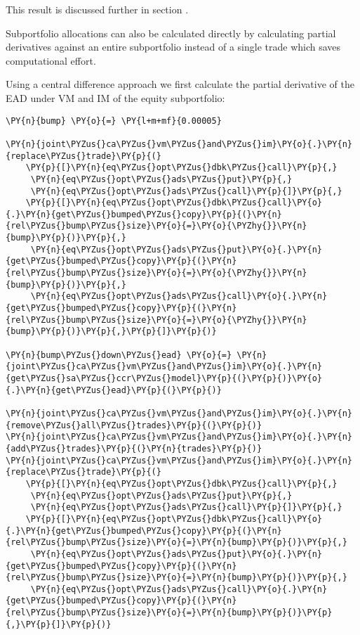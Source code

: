     This result is discussed further in section .

    Subportfolio allocations can also be calculated directly by calculating
partial derivatives against an entire subportfolio instead of a single
trade which saves computational effort.

Using a central difference approach we first calculate the partial
derivative of the EAD under VM and IM of the equity subportfolio:

    \begin{tcolorbox}[breakable, size=fbox, boxrule=1pt, pad at break*=1mm,colback=cellbackground, colframe=cellborder]
\begin{Verbatim}[commandchars=\\\{\}]
\PY{n}{bump} \PY{o}{=} \PY{l+m+mf}{0.00005}

\PY{n}{joint\PYZus{}ca\PYZus{}vm\PYZus{}and\PYZus{}im}\PY{o}{.}\PY{n}{replace\PYZus{}trade}\PY{p}{(}
    \PY{p}{[}\PY{n}{eq\PYZus{}opt\PYZus{}dbk\PYZus{}call}\PY{p}{,}
     \PY{n}{eq\PYZus{}opt\PYZus{}ads\PYZus{}put}\PY{p}{,}
     \PY{n}{eq\PYZus{}opt\PYZus{}ads\PYZus{}call}\PY{p}{]}\PY{p}{,}
    \PY{p}{[}\PY{n}{eq\PYZus{}opt\PYZus{}dbk\PYZus{}call}\PY{o}{.}\PY{n}{get\PYZus{}bumped\PYZus{}copy}\PY{p}{(}\PY{n}{rel\PYZus{}bump\PYZus{}size}\PY{o}{=}\PY{o}{\PYZhy{}}\PY{n}{bump}\PY{p}{)}\PY{p}{,}
     \PY{n}{eq\PYZus{}opt\PYZus{}ads\PYZus{}put}\PY{o}{.}\PY{n}{get\PYZus{}bumped\PYZus{}copy}\PY{p}{(}\PY{n}{rel\PYZus{}bump\PYZus{}size}\PY{o}{=}\PY{o}{\PYZhy{}}\PY{n}{bump}\PY{p}{)}\PY{p}{,}
     \PY{n}{eq\PYZus{}opt\PYZus{}ads\PYZus{}call}\PY{o}{.}\PY{n}{get\PYZus{}bumped\PYZus{}copy}\PY{p}{(}\PY{n}{rel\PYZus{}bump\PYZus{}size}\PY{o}{=}\PY{o}{\PYZhy{}}\PY{n}{bump}\PY{p}{)}\PY{p}{,}\PY{p}{]}\PY{p}{)}

\PY{n}{bump\PYZus{}down\PYZus{}ead} \PY{o}{=} \PY{n}{joint\PYZus{}ca\PYZus{}vm\PYZus{}and\PYZus{}im}\PY{o}{.}\PY{n}{get\PYZus{}sa\PYZus{}ccr\PYZus{}model}\PY{p}{(}\PY{p}{)}\PY{o}{.}\PY{n}{get\PYZus{}ead}\PY{p}{(}\PY{p}{)}

\PY{n}{joint\PYZus{}ca\PYZus{}vm\PYZus{}and\PYZus{}im}\PY{o}{.}\PY{n}{remove\PYZus{}all\PYZus{}trades}\PY{p}{(}\PY{p}{)}
\PY{n}{joint\PYZus{}ca\PYZus{}vm\PYZus{}and\PYZus{}im}\PY{o}{.}\PY{n}{add\PYZus{}trades}\PY{p}{(}\PY{n}{trades}\PY{p}{)}
\PY{n}{joint\PYZus{}ca\PYZus{}vm\PYZus{}and\PYZus{}im}\PY{o}{.}\PY{n}{replace\PYZus{}trade}\PY{p}{(}
    \PY{p}{[}\PY{n}{eq\PYZus{}opt\PYZus{}dbk\PYZus{}call}\PY{p}{,}
     \PY{n}{eq\PYZus{}opt\PYZus{}ads\PYZus{}put}\PY{p}{,}
     \PY{n}{eq\PYZus{}opt\PYZus{}ads\PYZus{}call}\PY{p}{]}\PY{p}{,}
    \PY{p}{[}\PY{n}{eq\PYZus{}opt\PYZus{}dbk\PYZus{}call}\PY{o}{.}\PY{n}{get\PYZus{}bumped\PYZus{}copy}\PY{p}{(}\PY{n}{rel\PYZus{}bump\PYZus{}size}\PY{o}{=}\PY{n}{bump}\PY{p}{)}\PY{p}{,}
     \PY{n}{eq\PYZus{}opt\PYZus{}ads\PYZus{}put}\PY{o}{.}\PY{n}{get\PYZus{}bumped\PYZus{}copy}\PY{p}{(}\PY{n}{rel\PYZus{}bump\PYZus{}size}\PY{o}{=}\PY{n}{bump}\PY{p}{)}\PY{p}{,}
     \PY{n}{eq\PYZus{}opt\PYZus{}ads\PYZus{}call}\PY{o}{.}\PY{n}{get\PYZus{}bumped\PYZus{}copy}\PY{p}{(}\PY{n}{rel\PYZus{}bump\PYZus{}size}\PY{o}{=}\PY{n}{bump}\PY{p}{)}\PY{p}{,}\PY{p}{]}\PY{p}{)}


\end{Verbatim}
\end{tcolorbox}
